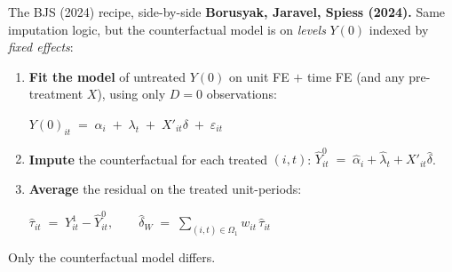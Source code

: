 \documentclass[aspectratio=169,11pt]{beamer}
\begin{document}
\begin{frame}{The BJS (2024) recipe, side-by-side}
\vspace{0.5em}
\textbf{Borusyak, Jaravel, Spiess (2024).} \;Same imputation logic, but the counterfactual model is on \textit{levels} $Y(0)$ indexed by \textit{fixed effects}:
\vspace{0.5em}
\begin{enumerate}\small
  \item \textbf{Fit the model} of untreated $Y(0)$ on unit FE $+$ time FE (and any pre-treatment $X$), using only $D=0$ observations:
  \begin{center}\small
  $Y(0)_{it} \;=\; \alpha_i \;+\; \lambda_t \;+\; X'_{it}\delta \;+\; \varepsilon_{it}$
  \end{center}
  \item \textbf{Impute} the counterfactual for each treated $(i,t)$: \;$\widehat{Y}^0_{it} \;=\; \widehat{\alpha}_i + \widehat{\lambda}_t + X'_{it}\widehat{\delta}$.
  \item \textbf{Average} the residual on the treated unit-periods:
  \begin{center}\small
  $\widehat{\tau}_{it} \;=\; Y^1_{it} - \widehat{Y}^0_{it}, \qquad \widehat{\delta}_W \;=\; \displaystyle\sum_{(i,t)\in\Omega_1} w_{it}\,\widehat{\tau}_{it}$
  \end{center}
\end{enumerate}
\vspace{0.4em}
 \;Only the counterfactual model differs.
\end{frame}
\end{document}
